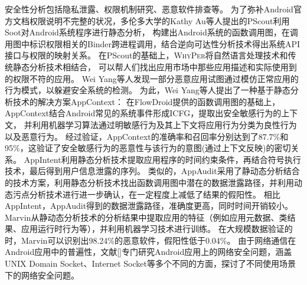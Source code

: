 安全性分析包括隐私泄露、权限机制研究、恶意软件排查等。
为了弥补Android官方文档权限说明不完整的状况，多伦多大学的Kathy Au等人提出的PScout\cite{au2012pscout}利用Soot对Android系统程序进行静态分析，
构建出Android系统的函数调用图，在调用图中标识权限相关的Binder跨进程调用，结合逆向可达性分析技术得出系统API接口与权限的映射关系。
在PScout的基础上，\textsc{WhyPer}\cite{pandita2013whyper}将自然语言处理技术和传统静态分析技术相结合，
可以帮人们找出应用市场中那些应用描述和实际使用到的权限不符的应用。
{Wei Yang等人发现一部分恶意应用试图通过模仿正常应用的行为模式，以躲避安全系统的检测。}
为此，Wei Yang等人提出了一种基于静态分析技术的解决方案AppContext\cite{yang2015appcontext}：
在FlowDroid提供的函数调用图的基础上，AppContext结合Android常见的系统事件形成ICFG，提取出安全敏感行为的上下文，
并利用机器学习算法通过明敏感行为及其上下文将应用行为分类为良性行为以及恶意行为。
经过验证，AppContext的准确率和召回率分别达到了87.7\%和95\%，这验证了安全敏感行为的恶意性与该行为的意图(通过上下文反映)的密切关系。
AppIntent\cite{yang2013appintent}利用静态分析技术提取应用程序的时间约束条件，再结合符号执行技术，最后得到用户信息泄露的序列。
类似的，AppAudit\cite{xia2015effective}采用了静动态分析结合的技术方案，利用静态分析技术找出函数调用图中潜在的数据泄露路径，并利用动态污点分析技术进行进一步确认，在一定程度上减低了结果的假阳性。
相比AppIntent，AppAudit得到的数据泄露路径，准确度更高，同时时间开销较小。
Marvin\cite{lindorfer2015marvin}从静动态分析技术的分析结果中提取应用的特征（例如应用元数据、类结果、应用运行时行为等），并利用机器学习技术进行训练。
在大规模数据验证的时，Marvin可以识别出98.24\%的恶意软件，假阳性低于0.04\%。
由于网络通信在Android应用中的普遍性，文献[]专门研究Android应用上的网络安全问题，涵盖UNIX Domain Socket、Internet Socket等多个不同的方面，探讨了不同使用场景下的网络安全问题。








